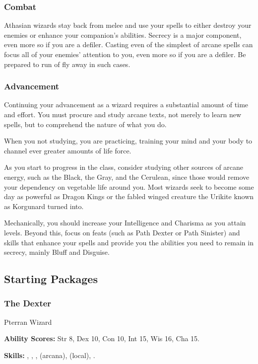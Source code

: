 \subsubsection{Combat}
Athasian wizards stay back from melee and use your spells to either destroy your enemies or enhance your companion's abilities. Secrecy is a major component, even more so if you are a defiler. Casting even of the simplest of arcane spells can focus all of your enemies' attention to you, even more so if you are a defiler. Be prepared to run of fly away in such cases.

\subsubsection{Advancement}
Continuing your advancement as a wizard requires a substantial amount of time and effort. You must procure and study arcane texts, not merely to learn new spells, but to comprehend the nature of what you do.

When you not studying, you are practicing, training your mind and your body to channel ever greater amounts of life force.

As you start to progress in the class, consider studying other sources of arcane energy, such as the Black, the Gray, and the Cerulean, since those would remove your dependency on vegetable life around you. Most wizards seek to become some day as powerful as Dragon Kings or the fabled winged creature the Urikite known as Korgunard turned into.

Mechanically, you should increase your Intelligence and Charisma as you attain levels. Beyond this, focus on feats (such as Path Dexter or Path Sinister) and skills that enhance your spells and provide you the abilities you need to remain in secrecy, mainly Bluff and Disguise.

\subsection{Starting Packages}
\subsubsection{The Dexter}
Pterran Wizard

\textbf{Ability Scores:} Str 8, Dex 10, Con 10, Int 15, Wis 16, Cha 15.

\textbf{Skills:} , , ,  (arcana),  (local), .


